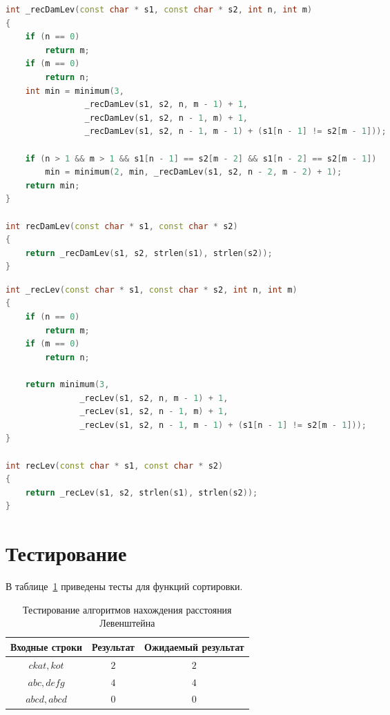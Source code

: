 \documentclass{report}
\begin{document}
\begin{lstlisting}[label=some-code,caption=Функция для рекурсивного нахождения расстояния Дамерау-Левенштейна,language=C++]
int _recDamLev(const char * s1, const char * s2, int n, int m)
{
    if (n == 0)
        return m;
    if (m == 0)
        return n;
    int min = minimum(3,
                _recDamLev(s1, s2, n, m - 1) + 1,
                _recDamLev(s1, s2, n - 1, m) + 1,
                _recDamLev(s1, s2, n - 1, m - 1) + (s1[n - 1] != s2[m - 1]));

    if (n > 1 && m > 1 && s1[n - 1] == s2[m - 2] && s1[n - 2] == s2[m - 1])
        min = minimum(2, min, _recDamLev(s1, s2, n - 2, m - 2) + 1);
    return min;
}

int recDamLev(const char * s1, const char * s2)
{
    return _recDamLev(s1, s2, strlen(s1), strlen(s2));
}

\end{lstlisting}
\newpage
\begin{lstlisting}[label=some-code,caption=Функция для рекурсивного нахождения расстояния Левенштейна, language=C++]
int _recLev(const char * s1, const char * s2, int n, int m)
{
    if (n == 0)
        return m;
    if (m == 0)
        return n;

    return minimum(3,
               _recLev(s1, s2, n, m - 1) + 1,
               _recLev(s1, s2, n - 1, m) + 1,
               _recLev(s1, s2, n - 1, m - 1) + (s1[n - 1] != s2[m - 1]));
}

int recLev(const char * s1, const char * s2)
{
    return _recLev(s1, s2, strlen(s1), strlen(s2));
}
\end{lstlisting}

\section{Тестирование}

В таблице~\ref{tbl:test} приведены тесты для функций сортировки.

\begin{table}[h!p]
	\begin{center}
		\caption{\label{tbl:test}Тестирование алгоритмов нахождения расстояния Левенштейна}
		\begin{tabular}{|c|c|c|}
			\hline
			Входные строки & Результат & Ожидаемый результат \\ 
			\hline
			$ckat, kot$ & $2$  & $2$\\\hline
			$abc, defg$  & $4$  & $4$\\\hline
			$abcd, abcd$  & $0$  & $0$\\\hline
		\end{tabular}
	\end{center}
\end{table}
\end{document}

